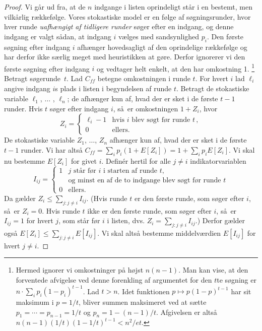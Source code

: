 \begin{proof}
\newcommand{\MTF}{{\mathit{ff}}}%
Vi går ud fra, at de $n$ indgange i listen oprindeligt står i en bestemt, men vilkårlig rækkefølge.
Vores stokastiske model er en følge af søgningsrunder, hvor hver runde \emph{uafhængigt af tidligere runder} søger efter en indgang, og denne indgang er valgt sådan, at indgang $i$ vælges med sandsynlighed $p_i$.
Den første søgning efter indgang $i$ afhænger hovedsagligt af den oprindelige rækkefølge og har derfor ikke særlig meget med heuristikken at gøre.
Derfor ignorerer vi den første søgning efter indgang $i$ og vedtager helt enkelt, at den har omkostning 1.
\footnote{Hermed ignorer vi omkostninger på højst $n(n-1)$.
Man kan vise, at den forventede afvigelse ved denne forenkling af argumentet for den $t$te søgning er 
$n\cdot \sum_i p_i(1-p_i)^{t-1}$.
Lad $t > n$. 
Idet funktionen $p\mapsto p(1-p)^{t-1}$ har sit maksimum i $p=1/t$, bliver summen maksimeret ved at sætte $p_1=\cdots=p_{n-1}=1/t$ og $p_n=1-(n-1)/t$.
Afgivelsen er altså  $n(n-1)(1/t)(1-1/t)^{t-1} < n^2/et$.}%
Betragt søgerunde~$t$.
Lad $C_{\MTF}$ betegne omkostningen i runde $t$.
For hvert  $i$ lad $\ell_i$ angive indgang $i$s plads i listen i begyndelsen af runde $t$.
Betragt de stokastiske variable $\ell_1$, $\ldots$ , $\ell_n$; de afhænger kun af, hvad der er sket i de første $t-1$ runder.
Hvis $t$ søger efter indgang $i$, så er omkostningen  $1+Z_i$, hvor
\[ Z_i = 
  \begin{cases}  
  \ell_i - 1 & \text{hvis $i$ blev søgt før runde $t$}\,,\\
            0 & \text{ellers.}
  \end{cases}
\]
De stokastiske variable $Z_1$, $\ldots$, $Z_n$ afhænger kun af, hvad der er sket i de første $t-1$ runder.
Vi har altså $C_{\MTF} = \sum_i p_i (1+E[Z_i]) = 1 + \sum_i p_i E[Z_i]$.
Vi skal nu bestemme $E[Z_i]$ for givet $i$.
Definér hertil for alle $j\neq i$ indikatorvariablen  
\[ I_{ij} = \begin{cases}  1 & \text{$j$ står før $i$ i starten af runde  $t$,}\\[-0.5ex]
  & \text{og minst en af de to indgange blev søgt før runde $t$}\\
           0 & \text{ellers.}\end{cases} \]
Da gælder $Z_i \le \sum_{j\colon j\neq i} I_{ij}$. 
(Hvis runde $t$ er den første runde, som søger efter $i$, så er $Z_i=0$. 
Hvis runde $t$ ikke er den første runde, som søger efter $i$, så er $I_{ij}=1$ for hvert $j$, som står før $i$ i listen, dvs. $Z_i=\sum_{j\colon j\not= i} I_{ij}$.)
Derfor gælder også $E[Z_i] \le \sum_{j\colon j\not= i} E[I_{ij}]$.
Vi skal altså bestemme middelværdien $E[I_{ij}]$ for hvert $j\not= i$. 


\end{proof}

